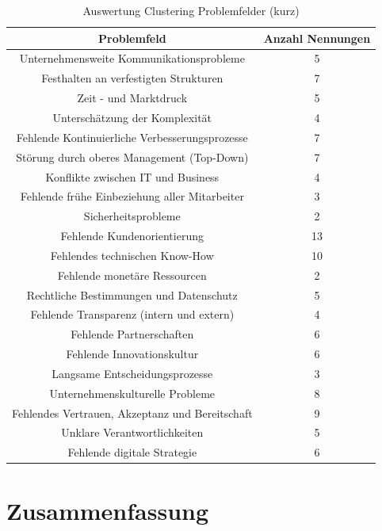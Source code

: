 
\begin{table}[ht]
	\centering
	\caption{Auswertung Clustering Problemfelder (kurz)}
	\begin{tabular}{|c|c|}
		\hline
		\textbf{Problemfeld}& \textbf{Anzahl Nennungen} \\
		\hline
		Unternehmensweite Kommunikationsprobleme        & 5  \\
		Festhalten an verfestigten Strukturen           & 7  \\
		Zeit - und Marktdruck                           & 5  \\
		Unterschätzung der Komplexität                  & 4  \\
		Fehlende Kontinuierliche Verbesserungsprozesse  & 7  \\
		Störung durch oberes Management (Top-Down)      & 7  \\
		Konflikte zwischen IT und Business              & 4  \\
		Fehlende frühe Einbeziehung aller Mitarbeiter   & 3  \\
		Sicherheitsprobleme                             & 2  \\
		Fehlende Kundenorientierung                     & 13 \\
		Fehlendes technischen Know-How                  & 10 \\
		Fehlende monetäre Ressourcen                    & 2  \\
		Rechtliche Bestimmungen und Datenschutz         & 5  \\
		Fehlende Transparenz (intern und extern)        & 4  \\
		Fehlende Partnerschaften                        & 6  \\
		Fehlende Innovationskultur                      & 6  \\
		Langsame Entscheidungsprozesse                  & 3  \\
		Unternehmenskulturelle Probleme                 & 8  \\
		Fehlendes Vertrauen, Akzeptanz und Bereitschaft & 9  \\
		Unklare Verantwortlichkeiten                    & 5  \\
		Fehlende digitale Strategie                     & 6 \\
		\hline
	\end{tabular}
	\label{tab:clusteringpfshort}
\end{table}

\todots

\section{Zusammenfassung}


